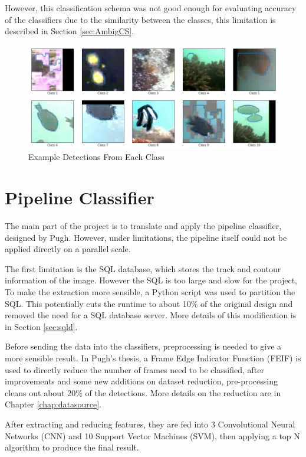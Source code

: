 \documentclass[bsc,logo,twoside,fullspacing,parskip]{infthesis}
\begin{document}
However, this classification schema was not good enough for evaluating accuracy of the classifiers due to the similarity between the classes, this limitation is described in Section \ref{sec:AmbigCS}.

\begin{figure}
    \centering
    \includegraphics[scale=0.4]{graph/class_sample.png}
    \caption{Example Detections From Each Class}
    \label{fig:classes}
\end{figure}

\section{Pipeline Classifier}

The main part of the project is to translate and apply the pipeline classifier, designed by Pugh\cite{Pugh}. 
However, under limitations, the pipeline itself could not be applied directly on a parallel scale.

The first limitation is the SQL database, which stores the track and contour information of the image. 
However the SQL is too large and slow for the project, To make the extraction more sensible, a Python script was used to partition the SQL.
This potentially cuts the runtime to about 10\% of the original design and removed the need for a SQL database server. 
More details of this modification is in Section \ref{sec:sqld}.

Before sending the data into the classifiers, preprocessing is needed to give a more sensible result.
In Pugh's thesis\cite{Pugh}, a Frame Edge Indicator Function (FEIF) is used to directly reduce the number of frames need to be classified, after improvements and some new additions on dataset reduction, pre-processing cleans out about 20\% of the detections. More details on the reduction are in Chapter \ref{chap:datasource}.

After extracting and reducing features, they are fed into 3 Convolutional Neural Networks (CNN) and 10 Support Vector Machines (SVM), then applying a top N algorithm to produce the final result. 
\end{document}
